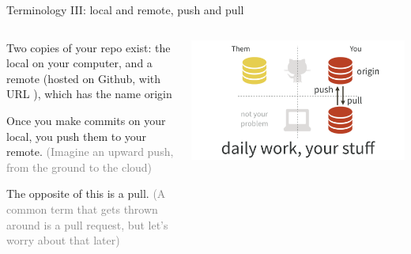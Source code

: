 \documentclass[ignorenonframetext, 10pt, aspectratio=169]{beamer}
\begin{document}
\begin{frame}{Terminology III: local and remote, push and pull}
\begin{columns}
\begin{column}{0.5\textwidth}
\begin{wideitemize}
\item Two copies of your repo exist: the \alert{local} on your computer, and a \alert{remote} (hosted on Github, with URL ), \pause which has the name \alert{origin}
\item Once you make commits on your local, you \alert{push} them to your remote. \textcolor{gray}{(Imagine an upward push, from the ground to the cloud)}
\item The opposite of this is a \alert{pull}. \textcolor{gray}{(A common term that gets thrown around is a \alert{pull request}, but let's worry about that later)}
\end{wideitemize}
\end{column}
\begin{column}{0.5\textwidth}
\includegraphics[width = \linewidth]{pull-push-yours.png}
\end{column}
\end{columns}
\end{frame}
\end{document}
